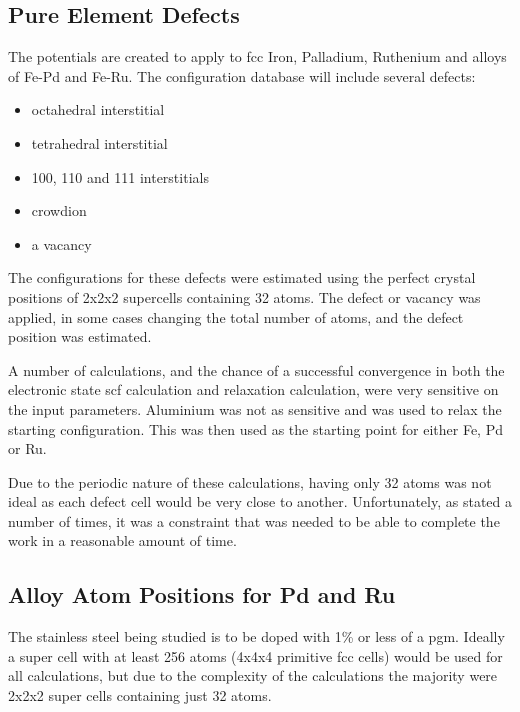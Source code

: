 \subsection{Pure Element Defects}

The potentials are created to apply to \acrshort{fcc} Iron, Palladium, Ruthenium and alloys of Fe-Pd and Fe-Ru.  The configuration database will include several defects:

\begin{itemize}
\item octahedral interstitial
\item tetrahedral interstitial
\item 100, 110 and 111 interstitials
\item crowdion
\item a vacancy
\end{itemize}

The configurations for these defects were estimated using the perfect crystal positions of 2x2x2 supercells containing 32 atoms.  The defect or vacancy was applied, in some cases changing the total number of atoms, and the defect position was estimated.

A number of calculations, and the chance of a successful convergence in both the electronic state \acrshort{scf} calculation and relaxation calculation, were very sensitive on the input parameters.  Aluminium was not as sensitive and was used to relax the starting configuration.  This was then used as the starting point for either Fe, Pd or Ru.

Due to the periodic nature of these calculations, having only 32 atoms was not ideal as each defect cell would be very close to another.  Unfortunately, as stated a number of times, it was a constraint that was needed to be able to complete the work in a reasonable amount of time.

\FloatBarrier
\subsection{Alloy Atom Positions for Pd and Ru}

The stainless steel being studied is to be doped with 1\% or less of a \acrlong{pgm}.  Ideally a super cell with at least 256 atoms (4x4x4 primitive \acrshort{fcc} cells) would be used for all calculations, but due to the complexity of the calculations the majority were 2x2x2 super cells containing just 32 atoms.

